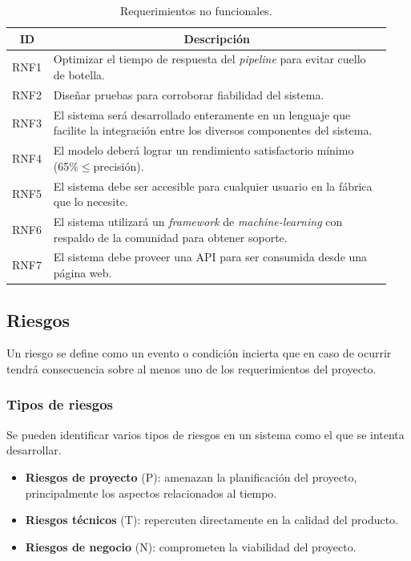 \documentclass[a4paper,12pt]{article}
\begin{document}
\begin{table}[H]
	\centering
	\begin{tabular}{p{0.07\linewidth} p{0.87\linewidth}}
		\hline
		\multicolumn{1}{c}{\textbf{ID}} & \multicolumn{1}{c}{\textbf{Descripción}}                                                                                         \\ \hline
		RNF1                            & Optimizar el tiempo de respuesta del \textit{pipeline} para evitar cuello de botella.                                             \\
		RNF2                            & Diseñar pruebas para corroborar fiabilidad del sistema.                                                                          \\
		RNF3                            & El sistema será desarrollado enteramente en un lenguaje que facilite la integración entre los diversos componentes del sistema. \\
		RNF4                            & El modelo deberá lograr un rendimiento satisfactorio mínimo (65\%$\leq$precisión).                                             \\
		RNF5                            & El sistema debe ser accesible para cualquier usuario en la fábrica que lo necesite.                                              \\
		RNF6                            & El sistema utilizará un \textit{framework} de \textit{machine-learning} con respaldo de la comunidad para obtener soporte.       \\
		RNF7                            & El sistema debe proveer una API para ser consumida desde una página web.                                                         \\ \hline
	\end{tabular}
	\caption{Requerimientos no funcionales.}
	\label{tab:non-functional-requirements}
\end{table}

\subsection{Riesgos}
Un riesgo se define como un evento o condición incierta que en caso de ocurrir tendrá consecuencia sobre al menos uno de los requerimientos del proyecto.
\subsubsection{Tipos de riesgos} \label{sec:risk-types}
Se pueden identificar varios tipos de riesgos en un sistema como el que se intenta desarrollar.
\begin{itemize}[noitemsep, topsep=2pt]
	\item \textbf{Riesgos de proyecto} (P): amenazan la planificación del proyecto, principalmente los aspectos relacionados al tiempo.
	\item \textbf{Riesgos técnicos} (T): repercuten directamente en la calidad del producto.
	\item \textbf{Riesgos de negocio} (N): comprometen la viabilidad del proyecto.
\end{itemize}
\end{document}
